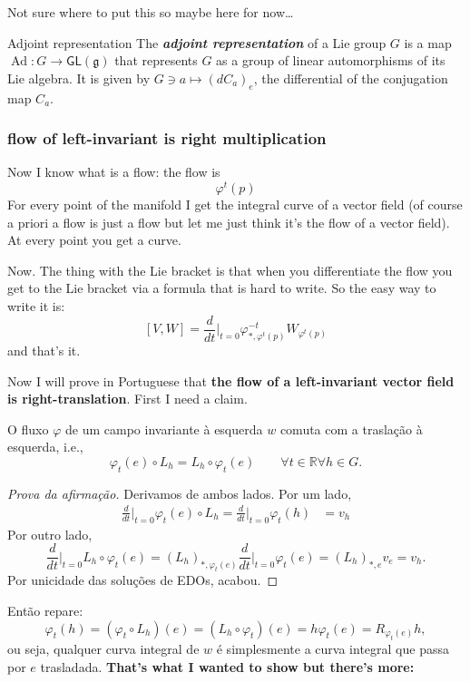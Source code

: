 Not sure where to put this so maybe here for now…

\begin{thing7}{Adjoint representation}\leavevmode
The \textit{\textbf{adjoint representation}} of a Lie group \(G\) is a map \(\operatorname{Ad}:G \to \mathsf{GL}(\mathfrak{g})\) that represents \(G\) as a group of linear automorphisms of its Lie algebra. It is given by \(G \ni a \mapsto (dC_a)_e\), the differential of the conjugation map \(C_a\).
\end{thing7}

\subsubsection*{flow of left-invariant is right multiplication}

Now I know what is a flow: the flow is
\[\varphi^t(p)\]
For every point of the manifold I get the integral curve of a vector field (of course a priori a flow is just a flow but let me just think it's the flow of a vector field). At every point you get a curve.

Now. The thing with the Lie bracket is that when you differentiate the flow you get to the Lie bracket via a formula that is hard to write. So the easy way to write it is:
\[[V,W]=\frac{d}{dt}\Big|_{t=0} \varphi^{-t}_{*,\varphi^t(p)}W_{\varphi^t(p)}\]
and that's it.



Now I will prove in Portuguese that \textbf{the flow of a left-invariant vector field is right-translation}. First I need a claim.

	\begin{claim}\leavevmode
	O fluxo \(\varphi\) de um campo invariante à esquerda \(w\) comuta com a traslação à esquerda, i.e.,
	\[\varphi_t(e)\circ L_h = L_h \circ \varphi_t(e)\qquad \forall t\in \mathbb{R} \forall h \in G.\]
	\end{claim}
	\begin{proof}[Prova da afirmação]\leavevmode
Derivamos de ambos lados. Por um lado,
\begin{align*}
\frac{d}{dt}\Big|_{t=0}\varphi_t(e) \circ L_h=\frac{d}{dt}\Big|_{t=0}\varphi_t(h)&=v_h\end{align*}
Por outro lado,
\[\frac{d}{dt}\Big|_{t=0}L_h \circ \varphi_t(e)=(L_h)_{*,\varphi_t(e)}\frac{d}{dt}\Big|_{t=0}\varphi_t(e)=(L_h)_{*,e}v_e=v_h.\]
Por unicidade das soluções de EDOs, acabou.
	\end{proof}
Então repare:
\[\varphi_t(h)=(\varphi_t\circ L_h)(e)=(L_h \circ \varphi_t)(e)=h\varphi_t(e)=R_{\varphi_t(e)}h,\]
ou seja, qualquer curva integral de \(w\) é simplesmente a curva integral que passa por \(e\) trasladada. \textbf{That's what I wanted to show but there's more:} 

